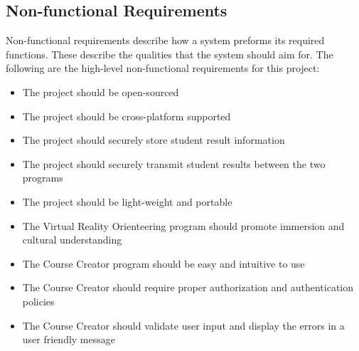 \subsection{Non-functional Requirements}
Non-functional requirements describe how a system preforms its required functions. These describe the qualities that the system should aim for. The following are the high-level non-functional requirements for this project:
\begin{itemize}
	\item The project should be open-sourced
	\item The project should be cross-platform supported
	\item The project should securely store student result information
	\item The project should securely transmit student results between the two programs
	\item The project should be light-weight and portable
	\item The Virtual Reality Orienteering program should promote immersion and cultural understanding
	\item The Course Creator program should be easy and intuitive to use
	\item The Course Creator should require proper authorization and authentication policies
	\item The Course Creator should validate user input and display the errors in a user friendly message
\end{itemize}